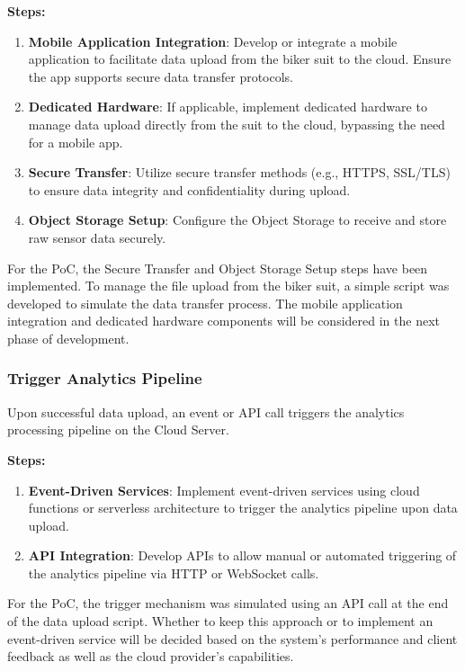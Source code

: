 \textbf{Steps:}
\begin{enumerate}
    \item \textbf{Mobile Application Integration}: Develop or integrate a mobile application to facilitate data upload from the biker suit to the cloud. Ensure the app supports secure data transfer protocols.
    \item \textbf{Dedicated Hardware}: If applicable, implement dedicated hardware to manage data upload directly from the suit to the cloud, bypassing the need for a mobile app.
    \item \textbf{Secure Transfer}: Utilize secure transfer methods (e.g., HTTPS, SSL/TLS) to ensure data integrity and confidentiality during upload.
    \item \textbf{Object Storage Setup}: Configure the Object Storage to receive and store raw sensor data securely.
\end{enumerate}

For the PoC, the Secure Transfer and Object Storage Setup steps have been implemented. To manage the file upload from the biker suit, a simple script was developed to simulate the data transfer process. The mobile application integration and dedicated hardware components will be considered in the next phase of development.



\subsubsection{Trigger Analytics Pipeline}
Upon successful data upload, an event or API call triggers the analytics processing pipeline on the Cloud Server.

\textbf{Steps:}
\begin{enumerate}
    \item \textbf{Event-Driven Services}: Implement event-driven services using cloud functions or serverless architecture to trigger the analytics pipeline upon data upload.
    \item \textbf{API Integration}: Develop APIs to allow manual or automated triggering of the analytics pipeline via HTTP or WebSocket calls.
\end{enumerate}

For the PoC, the trigger mechanism was simulated using an API call at the end of the data upload script. Whether to keep this approach or to implement an event-driven service will be decided based on the system's performance and client feedback as well as the cloud provider's capabilities.
